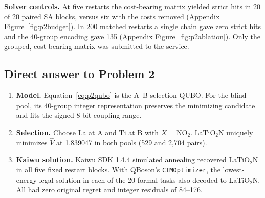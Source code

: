 \textbf{Solver controls.} At five restarts the cost-bearing matrix yielded strict hits in 20 of 20 paired SA blocks, versus six with the costs removed (Appendix Figure~\ref{fig:p2budget}). In 200 matched restarts a single chain gave zero strict hits and the 40-group encoding gave 135 (Appendix Figure~\ref{fig:p2ablation}). Only the grouped, cost-bearing matrix was submitted to the service.

\subsection{Direct answer to Problem 2}\label{sec:p2answer}
\begin{enumerate}
\item \textbf{Model.} Equation~\eqref{eq:p2qubo} is the A--B selection QUBO. For the blind pool, its 40-group integer representation preserves the minimizing candidate and fits the signed 8-bit coupling range.
\item \textbf{Selection.} Choose La at A and Ti at B with $X=\mathrm{NO_2}$. LaTiO$_2$N uniquely minimizes $\widehat V$ at 1.839047 in both pools (529 and 2,704 pairs).
\item \textbf{Kaiwu solution.} Kaiwu SDK 1.4.4 simulated annealing recovered LaTiO$_2$N in all five fixed restart blocks. With QBoson's \texttt{CIMOptimizer}, the lowest-energy legal solution in each of the 20 formal tasks also decoded to LaTiO$_2$N. All had zero original regret and integer residuals of 84--176.
\end{enumerate}
